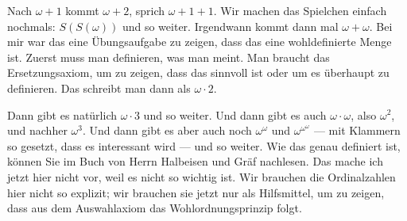 \begin{spoken-clean}[00:34:45 - 00:36:15]
Nach $\omega + 1$ kommt $\omega + 2$, sprich $\omega + 1 + 1$. Wir machen das Spielchen einfach nochmals: $S(S(\omega))$ und so weiter. Irgendwann kommt dann mal $\omega + \omega$. Bei mir war das eine Übungsaufgabe zu zeigen, dass das eine wohldefinierte Menge ist. Zuerst muss man definieren, was man meint. Man braucht das Ersetzungsaxiom, um zu zeigen, dass das sinnvoll ist oder um es überhaupt zu definieren. Das schreibt man dann als $\omega \cdot 2$.

Dann gibt es natürlich $\omega \cdot 3$ und so weiter. Und dann gibt es auch $\omega \cdot \omega$, also $\omega^2$, und nachher $\omega^3$. Und dann gibt es aber auch noch $\omega^\omega$ und $\omega^{\omega^\omega}$ --- mit Klammern so gesetzt, dass es interessant wird --- und so weiter. Wie das genau definiert ist, können Sie im Buch von Herrn Halbeisen und Gräf nachlesen. Das mache ich jetzt hier nicht vor, weil es nicht so wichtig ist. Wir brauchen die Ordinalzahlen hier nicht so explizit; wir brauchen sie jetzt nur als Hilfsmittel, um zu zeigen, dass aus dem Auswahlaxiom das Wohlordnungsprinzip folgt.
\end{spoken-clean}

\begin{ai-global-state-checkpoint-invisible-content}
\end{ai-global-state-checkpoint-invisible-content}

